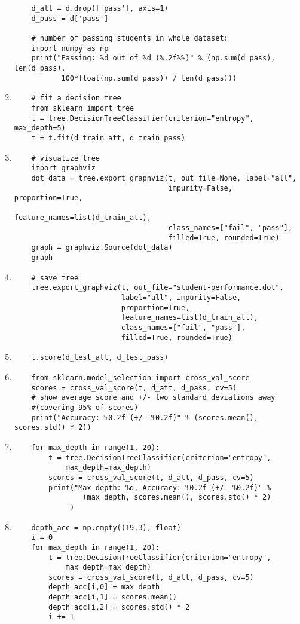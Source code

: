 \begin{enumerate}
\begin{verbatim}
	d_att = d.drop(['pass'], axis=1)
	d_pass = d['pass']

	# number of passing students in whole dataset:
	import numpy as np
	print("Passing: %d out of %d (%.2f%%)" % (np.sum(d_pass), len(d_pass), 
	       100*float(np.sum(d_pass)) / len(d_pass)))
\end{verbatim}
\item 
\begin{verbatim}
	# fit a decision tree
	from sklearn import tree
	t = tree.DecisionTreeClassifier(criterion="entropy", max_depth=5)
	t = t.fit(d_train_att, d_train_pass)
\end{verbatim}
\item
\begin{verbatim}
	# visualize tree
	import graphviz
	dot_data = tree.export_graphviz(t, out_file=None, label="all", 
									impurity=False, proportion=True,
	                                feature_names=list(d_train_att), 
									class_names=["fail", "pass"], 
	                                filled=True, rounded=True)
	graph = graphviz.Source(dot_data)
	graph
\end{verbatim}
\item
\begin{verbatim}
	# save tree
	tree.export_graphviz(t, out_file="student-performance.dot", 
						 label="all", impurity=False, 
						 proportion=True,
	                     feature_names=list(d_train_att), 
	                     class_names=["fail", "pass"], 
	                     filled=True, rounded=True)
\end{verbatim}
\item
\begin{verbatim}
	t.score(d_test_att, d_test_pass)
\end{verbatim}
\item
\begin{verbatim}
	from sklearn.model_selection import cross_val_score
	scores = cross_val_score(t, d_att, d_pass, cv=5)
	# show average score and +/- two standard deviations away 
	#(covering 95% of scores)
	print("Accuracy: %0.2f (+/- %0.2f)" % (scores.mean(), scores.std() * 2))
\end{verbatim}
\item 
\begin{verbatim}
	for max_depth in range(1, 20):
	    t = tree.DecisionTreeClassifier(criterion="entropy", 
			max_depth=max_depth)
	    scores = cross_val_score(t, d_att, d_pass, cv=5)
	    print("Max depth: %d, Accuracy: %0.2f (+/- %0.2f)" % 
				(max_depth, scores.mean(), scores.std() * 2)
			 )
\end{verbatim}
\item
\begin{verbatim}
	depth_acc = np.empty((19,3), float)
	i = 0
	for max_depth in range(1, 20):
	    t = tree.DecisionTreeClassifier(criterion="entropy", 
			max_depth=max_depth)
	    scores = cross_val_score(t, d_att, d_pass, cv=5)
	    depth_acc[i,0] = max_depth
	    depth_acc[i,1] = scores.mean()
	    depth_acc[i,2] = scores.std() * 2
	    i += 1


\end{verbatim}
\end{enumerate}
